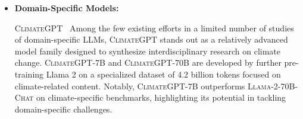 {\begin{itemize}[topsep=5pt, leftmargin=1em]
    \textsc{Gemini-2.0-Flash-Thinking-Exp}~\cite{deepmind_gemini_flash_thinking}, built on \textsc{Gemini-2.0-Flash-Exp} with extension of "thinking". This model showcases enhanced consistency between its reasoning processes and outputs, effectively solving complex problems, especially in science and mathematics. In our setting, version \textsc{Gemini-2.0-Flash-Thinking-Exp(01-21)} is adopted.
    
    
    \textsc{DeepSeek-R1}~\cite{deepseekai2025deepseekr1incentivizingreasoningcapability} model trained via large-scale reinforcement learning (RL) without supervised fine-tuning (SFT) as an initial step, delivers remarkable performance in reasoning tasks. As an open-source model, it matches the reasoning performance of proprietary models like \textsc{GPT-o1} in domains such as mathematics, programming, and general reasoning. 
    

\item \textbf{Domain-Specific Models:} 
    
    \textsc{ClimateGPT}~\cite{thulke2024climategpt} Among the few existing efforts in a limited number of studies of domain-specific LLMs, \textsc{ClimateGPT} stands out as a relatively advanced model family designed to synthesize interdisciplinary research on climate change. \textsc{ClimateGPT-7B} and \textsc{ClimateGPT-70B} are developed by further pre-training Llama 2 on a specialized dataset of 4.2 billion tokens focused on climate-related content. Notably, \textsc{ClimateGPT-7B} outperforms \textsc{Llama-2-70B-Chat} on climate-specific benchmarks, highlighting its potential in tackling domain-specific challenges.

\end{itemize}
}
\fi




